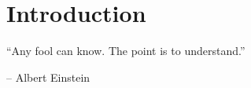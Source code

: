 \documentclass[../thesis.tex]{subfiles}
\begin{document}
\def\crossref{}
\def\biblio{}

\chapter{Introduction}


\epigraph{``Any fool can know. The point is to understand.''}{-- Albert Einstein}



\startcontents[chap]





\stopcontents[chap]

\cbiblio{}
\end{document}
